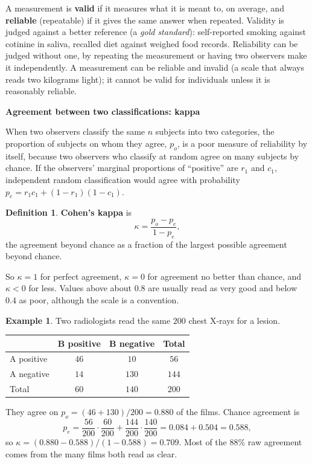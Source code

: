 \documentclass[11pt,a4paper]{article}
\numberwithin{equation}{section}
\theoremstyle{definition}
\newtheorem{defn}[thm]{Definition}
\newtheorem{exa}[thm]{Example}
\newcommand{\subhead}[1]{%
  \par\medskip\noindent\textbf{#1}\par\nobreak\smallskip}
\begin{document}
A measurement is \textbf{valid} if it measures what it is meant to, on average, and \textbf{reliable} (repeatable) if it gives the same answer
when repeated. Validity is judged against a better reference (a \emph{gold standard}): self-reported smoking against cotinine in saliva,
recalled diet against weighed food records. Reliability can be judged without one, by repeating the measurement or having two observers
make it independently. A measurement can be reliable and invalid (a scale that always reads two kilograms light); it cannot be valid
for individuals unless it is reasonably reliable.

\subhead{Agreement between two classifications: kappa}

When two observers classify the same $n$ subjects into two categories, the proportion of subjects on whom they agree, $p_o$, is a poor
measure of reliability by itself, because two observers who classify at random agree on many subjects by chance. If the observers'
marginal proportions of ``positive'' are $r_1$ and $c_1$, independent random classification would agree with probability
$p_e = r_1 c_1 + (1 - r_1)(1 - c_1)$.

\begin{defn}
\textbf{Cohen's kappa} is
\[
\kappa = \frac{p_o - p_e}{1 - p_e} ,
\]
the agreement beyond chance as a fraction of the largest possible agreement beyond chance.
\end{defn}

So $\kappa = 1$ for perfect agreement, $\kappa = 0$ for agreement no better than chance, and $\kappa < 0$ for less. Values above about $0.8$ are
usually read as very good and below $0.4$ as poor, although the scale is a convention.

\begin{exa}
\label{exa:kappa}
Two radiologists read the same $200$ chest X-rays for a lesion.
\begin{center}
\begin{tabular}{l|cc|c}
 & B positive & B negative & Total \\
\hline
A positive & $46$ & $10$ & $56$ \\
A negative & $14$ & $130$ & $144$ \\
\hline
Total & $60$ & $140$ & $200$ \\
\end{tabular}
\end{center}
They agree on $p_o = (46 + 130)/200 = 0.880$ of the films. Chance agreement is
\[
p_e = \frac{56}{200} \cdot \frac{60}{200} + \frac{144}{200} \cdot \frac{140}{200} = 0.084 + 0.504 = 0.588 ,
\]
so $\kappa = (0.880 - 0.588)/(1 - 0.588) = 0.709$. Most of the $88\%$ raw agreement comes from the many films both read as clear.
\end{exa}
\end{document}
